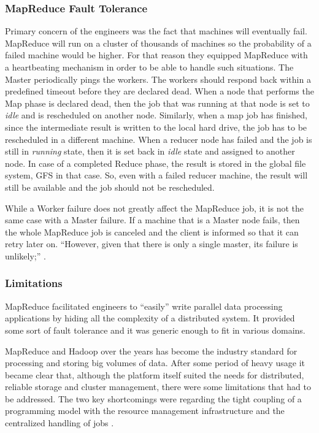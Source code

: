 \subsubsection{MapReduce Fault Tolerance}
Primary concern of the engineers was the fact
that machines will eventually fail. MapReduce will run on a cluster of
thousands of machines so the probability of a failed machine would be
higher. For that reason they equipped MapReduce with a heartbeating
mechanism in order to be able to handle such situations.
The Master periodically pings the workers. The workers should respond back
within a predefined timeout before they are declared dead. When a node
that performs the Map phase is declared dead, then the job that was
running at that node is set to \emph{idle} and is rescheduled on
another node. Similarly, when a map job has finished, since the
intermediate result is written to the local hard drive, the job has to
be rescheduled in a different machine. When a reducer node has failed
and the job is still in \emph{running} state, then it is set back in
\emph{idle} state and assigned to another node. In case of a completed
Reduce phase, the result is stored in the global file system, GFS in
that case. So, even with a failed reducer machine, the result will
still be available and the job should not be rescheduled.

While a Worker failure does not greatly affect the MapReduce job, it
is not the same case with a Master failure. If a machine that is a
Master node fails, then the whole MapReduce job is canceled and the
client is informed so that it can retry later on. ``However, given
that there is only a single master, its failure is unlikely;''
\cite{Dean:2004:MSD:1251254.1251264}.

\subsubsection{Limitations}
MapReduce facilitated engineers to ``easily'' write parallel data
processing applications by hiding all the complexity of a distributed
system. It provided some sort of fault tolerance and it was generic
enough to fit in various domains.

MapReduce and Hadoop over the years has become the industry standard
for processing and storing big volumes of data. After some period of
heavy usage it became clear that, although the platform itself suited
the needs for distributed, reliable storage and cluster management,
there were some limitations that had to be addressed. The two key
shortcomings were regarding the tight coupling of a programming model
with the resource management infrastructure and the centralized
handling of jobs \cite{Vavilapalli:2013:AHY:2523616.2523633, 6680946}.

